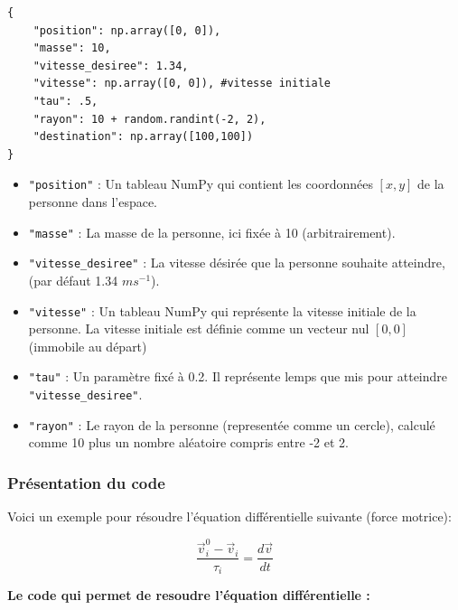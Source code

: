 \documentclass[a4paper,12pt]{article}
\begin{document}
\begin{verbatim}
{
	"position": np.array([0, 0]),
	"masse": 10,
	"vitesse_desiree": 1.34, 
	"vitesse": np.array([0, 0]), #vitesse initiale
	"tau": .5,
	"rayon": 10 + random.randint(-2, 2),
	"destination": np.array([100,100])
} 
\end{verbatim}

\begin{itemize}
    \item \texttt{"position"} : Un tableau NumPy qui contient les coordonnées \([x, y]\) de la personne dans l'espace. 
    
    \item \texttt{"masse"} : La masse de la personne, ici fixée à 10 (arbitrairement).
    
    \item \texttt{"vitesse\_desiree"} : La vitesse désirée que la personne souhaite atteindre, (par défaut 1.34 $ms^{-1}$).
    
    \item \texttt{"vitesse"} : Un tableau NumPy qui représente la vitesse initiale de la personne. La vitesse initiale est définie comme un vecteur nul \([0, 0]\) (immobile au départ)
    
    \item \texttt{"tau"} : Un paramètre fixé à 0.2. Il représente lemps que mis pour atteindre \texttt{"vitesse\_desiree"}.
    
    \item \texttt{"rayon"} : Le rayon de la personne (representée comme un cercle), calculé comme 10 plus un nombre aléatoire compris entre -2 et 2. 
\end{itemize}

\subsubsection{Présentation du code}

Voici un exemple pour résoudre l'équation différentielle suivante (force motrice):

\begin{equation}
\frac{\vec{v}_i^0 - \vec{v}_i}{\tau_i} = \frac{d\vec{v}}{dt}
\end{equation}

\newpage

\textbf{Le code qui permet de resoudre l'équation différentielle :}
\end{document}
